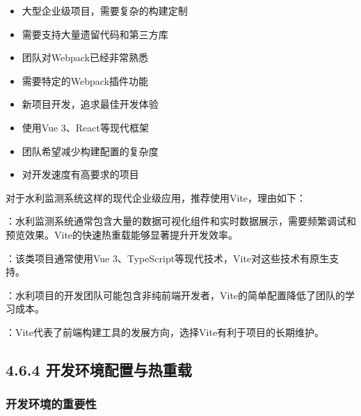

\begin{itemize}
\tightlist
\item
  大型企业级项目，需要复杂的构建定制
\item
  需要支持大量遗留代码和第三方库
\item
  团队对Webpack已经非常熟悉
\item
  需要特定的Webpack插件功能
\end{itemize}


\begin{itemize}
\tightlist
\item
  新项目开发，追求最佳开发体验
\item
  使用Vue 3、React等现代框架
\item
  团队希望减少构建配置的复杂度
\item
  对开发速度有高要求的项目
\end{itemize}


对于水利监测系统这样的现代企业级应用，推荐使用Vite，理由如下：

：水利监测系统通常包含大量的数据可视化组件和实时数据展示，需要频繁调试和预览效果。Vite的快速热重载能够显著提升开发效率。

：该类项目通常使用Vue 3、TypeScript等现代技术，Vite对这些技术有原生支持。

：水利项目的开发团队可能包含非纯前端开发者，Vite的简单配置降低了团队的学习成本。

：Vite代表了前端构建工具的发展方向，选择Vite有利于项目的长期维护。

\hypertarget{ux5f00ux53d1ux73afux5883ux914dux7f6eux4e0eux70edux91cdux8f7d}{%
\subsection{4.6.4 开发环境配置与热重载}\label{ux5f00ux53d1ux73afux5883ux914dux7f6eux4e0eux70edux91cdux8f7d}}

\hypertarget{ux5f00ux53d1ux73afux5883ux7684ux91cdux8981ux6027}{%
\subsubsection{开发环境的重要性}\label{ux5f00ux53d1ux73afux5883ux7684ux91cdux8981ux6027}}

